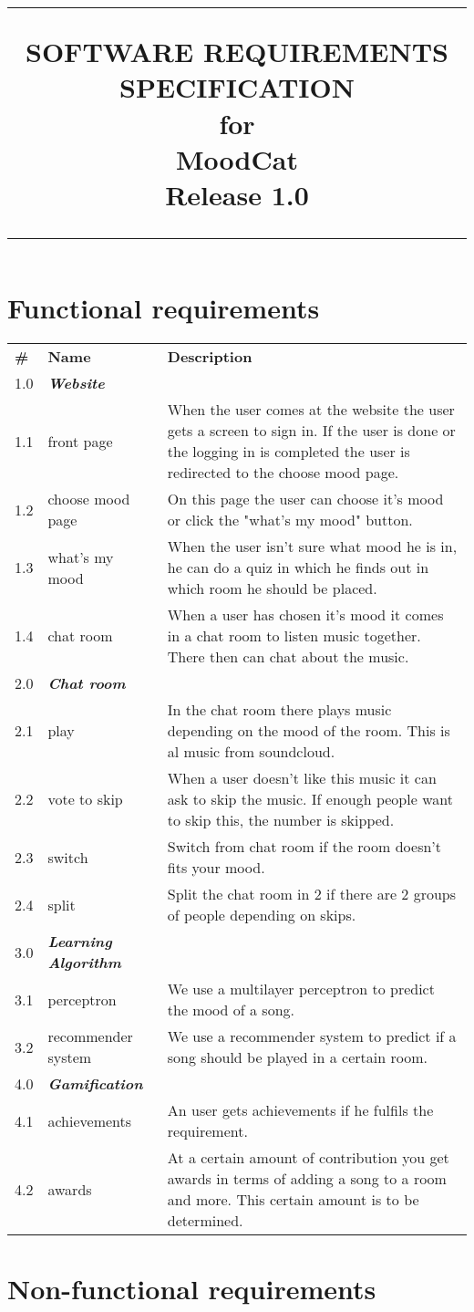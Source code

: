 \documentclass{scrreprt}
\title{%
\flushright
\rule{16cm}{5pt}\vskip1cm
\Huge{SOFTWARE REQUIREMENTS\\ SPECIFICATION}\\
\vspace{2cm}
for\\
\vspace{2cm}
MoodCat\\
\vspace{2cm}
\LARGE{Release 1.0\\}
\vfill
\rule{16cm}{5pt}
}
\date{}
\begin{document}
\maketitle



\chapter*{Functional requirements}
\begin{table}[h]
\begin{tabular}{|p{1cm}|p{3cm}|p{14cm}|}
\textbf{\#} & \textbf{Name} & \textbf{Description} \\
      1.0   & \textbf{\textit{Website}} &  \\
   	  1.1   & front page & When the user comes at the website the user gets a screen to sign in.
   	   If the user is done or the logging in is completed the user is redirected to the choose mood page.  \\
      1.2   & choose mood page & On this page the user can choose it's mood or click the "what's my mood" button.\\
      1.3   & what's my mood & When the user isn't sure what mood he is in, he can do a quiz in which he finds out in which room he should be placed. \\
      1.4  	& chat room & When a user has chosen it's mood it comes in a chat room to listen music together. 
      		 There then can chat about the music. \\   
      		 
      2.0 	& \textbf{\textit{Chat room}} & \\
	  2.1   & play & In the chat room there plays music depending on the mood of the room. This is al music from soundcloud.\\
	  2.2   & vote to skip & When a user doesn't like this music it can ask to skip the music. If enough people want to skip this, the number is skipped. \\
	  2.3   & switch & Switch from chat room if the room doesn't fits your mood. \\
	  2.4   & split  & Split the chat room in 2 if there are 2 groups of people depending on skips. \\
	  3.0	& \textbf{\textit{Learning Algorithm}} & \\
	  3.1   & perceptron & We use a multilayer perceptron to predict the mood of a song. \\
	  3.2   & recommender system & We use a recommender system to predict if a song should be played in a certain room. \\  
      4.0   & \textbf{\textit{Gamification}} &  \\
      4.1   & achievements  & An user gets achievements if he fulfils the requirement.     \\
      4.2   & awards  & At a certain amount of contribution you get awards in terms of adding a song to a room and more. This certain amount is to be determined.            
\end{tabular}
\end{table}
	
\chapter*{Non-functional requirements}
\end{document}

